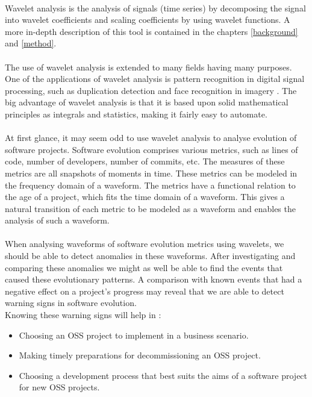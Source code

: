\paragraph{}
Wavelet analysis is the analysis of signals (time series) by decomposing the
signal into wavelet coefficients and scaling coefficients by using wavelet
functions. A more in-depth description of this tool is contained in the chapters
\ref{background} and \ref{method}.

\paragraph{}
The use of wavelet analysis is extended to many fields having many purposes.
One of the applications of wavelet analysis is pattern recognition in digital
signal processing, such as duplication detection and face recognition in
imagery \cite{myna, wadkar}. The big advantage of wavelet analysis is that
it is based upon solid mathematical principles as integrals and statistics,
making it fairly easy to automate.

\paragraph{}
At first glance, it may seem odd to use wavelet analysis to analyse evolution of
software projects. Software evolution comprises various metrics, such as lines
of code, number of developers, number of commits, etc. The measures of these
metrics are all snapshots of moments in time. These metrics can be modeled in
the frequency domain of a waveform. The metrics have a functional relation to
the age of a project, which fits the time domain of a waveform. This gives a
natural transition of each metric to be modeled as a waveform and enables the
analysis of such a waveform.

\paragraph{}
When analysing waveforms of software evolution metrics using wavelets, we
should be able to detect anomalies in these waveforms. After investigating and
comparing these anomalies we might as well be able to find the events that
caused these evolutionary patterns. A comparison with known events that had a
negative effect on a project's progress may reveal that we are able to detect
warning signs in software evolution.\\

\noindent
Knowing these warning signs will help in \cite{karus2013}:
\begin{itemize}
	\item Choosing an OSS project to implement in a business scenario.
	\item Making timely preparations for decommissioning an OSS project.
	\item Choosing a development process that best suits the aims of a software
	project for new OSS projects.
\end{itemize}

